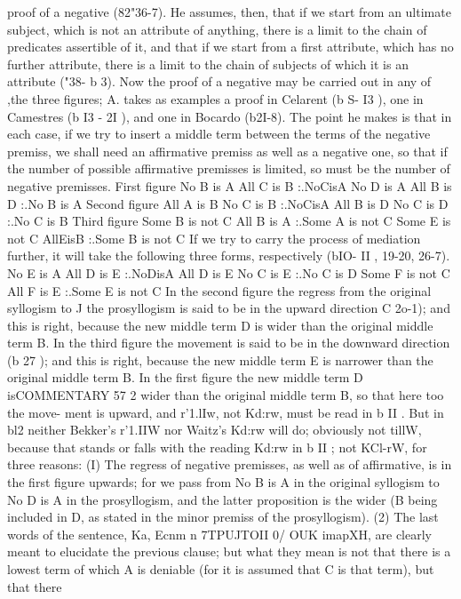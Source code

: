 {{{{{{{{{{{{{{{{{proof of a negative (82"36-7). He assumes, then, that if we start
from an ultimate subject, which is not an attribute of anything,
there is a limit to the chain of predicates assertible of it, and that
if we start from a first attribute, which has no further attribute,
there is a limit to the chain of subjects of which it is an attribute
("38- b 3). Now the proof of a negative may be carried out in any
of ,the three figures; A. takes as examples a proof in Celarent
(b S- I3 ), one in Camestres (b I3 - 2I ), and one in Bocardo (b2I-8).
The point he makes is that in each case, if we try to insert a
middle term between the terms of the negative premiss, we shall
need an affirmative premiss as well as a negative one, so that if
the number of possible affirmative premisses is limited, so must
be the number of negative premisses.
First figure
No B is A
All C is B
:.NoCisA
No D is A
All B is D
:.No B is A
Second figure
All A is B
No C is B
:.NoCisA
All B is D
No C is D
:.No C is B
Third figure
Some B is not C
All B is A
:.Some A is not C
Some E is not C
AllEisB
:.Some B is not C
If we try to carry the process of mediation further, it will take
the following three forms, respectively (bIO- II , 19-20, 26-7).
No E is A
All D is E
:.NoDisA
All D is E
No C is E
:.No C is D
Some F is not C
All F is E
:.Some E is not C
In the second figure the regress from the original syllogism to
J
the prosyllogism is said to be in the upward direction C
2o-1);
and this is right, because the new middle term D is wider than
the original middle term B. In the third figure the movement is
said to be in the downward direction (b 27 ); and this is right,
because the new middle term E is narrower than the original
middle term B. In the first figure the new middle term D isCOMMENTARY
57 2
wider than the original middle term B, so that here too the move-
ment is upward, and r'1.lIw, not Kd:rw, must be read in b II . But in
bl2 neither Bekker's r'1.IIW nor Waitz's Kd:rw will do; obviously not
tillW, because that stands or falls with the reading Kd:rw in b II ;
not KCl-rW, for three reasons: (I) The regress of negative premisses,
as well as of affirmative, is in the first figure upwards; for we
pass from No B is A in the original syllogism to No D is A in
the prosyllogism, and the latter proposition is the wider (B being
included in D, as stated in the minor premiss of the prosyllogism).
(2) The last words of the sentence, Ka, Ecnm n 7TPUJTOII 0/ OUK
imapXH, are clearly meant to elucidate the previous clause; but
what they mean is not that there is a lowest term of which A
is deniable (for it is assumed that C is that term), but that there
}}}}}}}}}}}}}}}}}
